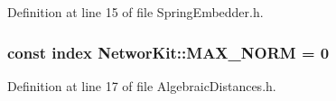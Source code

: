 Definition at line 15 of file Spring\-Embedder.\-h.

\hypertarget{namespace_networ_kit_a9b1d7bac39eea8fc38c8b081d78723d7}{
\subsubsection[{M\-A\-X\-\_\-\-N\-O\-R\-M}]{\setlength{\rightskip}{0pt plus 5cm}const {\bf index} Networ\-Kit\-::\-M\-A\-X\-\_\-\-N\-O\-R\-M = 0}}\label{namespace_networ_kit_a9b1d7bac39eea8fc38c8b081d78723d7}


Definition at line 17 of file Algebraic\-Distances.\-h.

